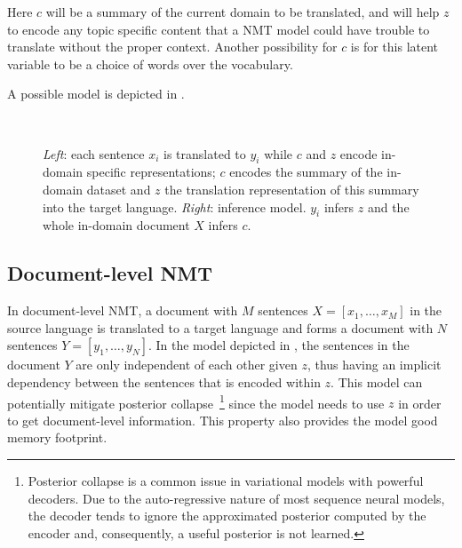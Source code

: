 Here $c$ will be a summary of the current domain to be translated,
and will help $z$ to encode any topic specific content that a NMT
model could have trouble to translate without the proper context.
Another possibility for $c$ is for this latent variable to be a
choice of words over the vocabulary.

A possible model is depicted in .

\begin{figure}[t]
    \centering
    ~

    \caption{{\it Left}: each sentence $x_i$ is translated to $y_i$
    while $c$ and $z$ encode in-domain specific representations; $c$
    encodes the summary of the in-domain dataset and $z$ the
    translation representation of this summary into the target
    language.
    {\it Right}: inference model. $y_i$ infers $z$ and the whole
    in-domain document $X$ infers $c$.}
    \label{fig:indomainstatistician}
\end{figure}

\subsection{Document-level NMT}

In document-level NMT, a document with $M$ sentences $X=[x_1, \dots,
x_M]$ in the source language is translated to a target language and
forms a document with $N$ sentences $Y=[y_1, \dots, y_N]$. In the
model depicted in , the sentences in the
document $Y$ are only independent of each other given $z$, thus
having an implicit dependency between the sentences that is encoded
within $z$. This model can potentially mitigate posterior
collapse~\footnote{Posterior collapse is a common issue in
variational models with powerful decoders. Due to the auto-regressive
nature of most sequence neural models, the decoder tends to ignore
the approximated posterior computed by the encoder and, consequently,
a useful posterior is not learned.} since the model needs to use $z$
in order to get document-level information. This property also
provides the model good memory footprint.

